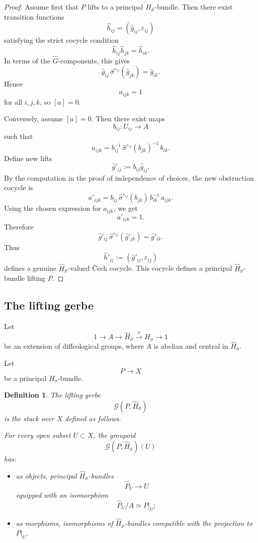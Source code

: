 \documentclass[11pt]{amsart}
\newtheorem{definition}{Definition}[section]
\begin{document}
\begin{proof}
Assume first that \(P\) lifts to a principal \(\widehat H_{\widehat\sigma}\)-bundle. Then there exist transition functions
\[
\widehat h_{ij}=(\widehat g_{ij},\varepsilon_{ij})
\]
satisfying the strict cocycle condition
\[
\widehat h_{ij}\widehat h_{jk}=\widehat h_{ik}.
\]
In terms of the \(\widehat G\)-components, this gives
\[
\widehat g_{ij}\,
\widehat\sigma^{\varepsilon_{ij}}(\widehat g_{jk})
=
\widehat g_{ik}.
\]
Hence
\[
a_{ijk}=1
\]
for all \(i,j,k\), so \([a]=0\).

Conversely, assume \([a]=0\). Then there exist maps
\[
b_{ij}:U_{ij}\to A
\]
such that
\[
a_{ijk}
=
b_{ij}^{-1}\,
\widehat\sigma^{\varepsilon_{ij}}(b_{jk})^{-1}\,
b_{ik}.
\]
Define new lifts
\[
\widehat g'_{ij}:=b_{ij}\widehat g_{ij}.
\]
By the computation in the proof of independence of choices, the new obstruction cocycle is
\[
a'_{ijk}
=
b_{ij}\,
\widehat\sigma^{\varepsilon_{ij}}(b_{jk})\,
b_{ik}^{-1}
\,a_{ijk}.
\]
Using the chosen expression for \(a_{ijk}\), we get
\[
a'_{ijk}=1.
\]
Therefore
\[
\widehat g'_{ij}\,
\widehat\sigma^{\varepsilon_{ij}}(\widehat g'_{jk})
=
\widehat g'_{ik}.
\]
Thus
\[
\widehat h'_{ij}:=(\widehat g'_{ij},\varepsilon_{ij})
\]
defines a genuine \(\widehat H_{\widehat\sigma}\)-valued Čech cocycle. This cocycle defines a principal \(\widehat H_{\widehat\sigma}\)-bundle lifting \(P\).
\end{proof}

\subsection{The lifting gerbe}

Let
\[
1\longrightarrow A
\longrightarrow
\widehat H_{\widehat\sigma}
\stackrel{\pi}{\longrightarrow}
H_\sigma
\longrightarrow 1
\]
be an extension of diffeological groups, where \(A\) is abelian and central in
\(\widehat H_{\widehat\sigma}\).

Let
\[
P\to X
\]
be a principal \(H_\sigma\)-bundle.

\begin{definition}
The \emph{lifting gerbe}
\[
\mathcal G(P,\widehat H_{\widehat\sigma})
\]
is the stack over \(X\) defined as follows.

For every open subset \(U\subset X\), the groupoid
\[
\mathcal G(P,\widehat H_{\widehat\sigma})(U)
\]
has:
\begin{itemize}
\item as objects, principal
\(\widehat H_{\widehat\sigma}\)-bundles
\[
\widehat P_U\to U
\]
equipped with an isomorphism
\[
\widehat P_U/A \simeq P|_U;
\]

\item as morphisms, isomorphisms of
\(\widehat H_{\widehat\sigma}\)-bundles compatible with the projection to
\(P|_U\).
\end{itemize}
\end{definition}
\end{document}
